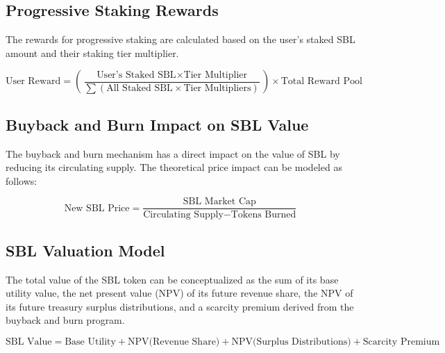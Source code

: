 \subsection{Progressive Staking Rewards}
The rewards for progressive staking are calculated based on the user's staked SBL amount and their staking tier multiplier.

\begin{equation}
\text{User Reward} = (\frac{\text{User's Staked SBL} \times \text{Tier Multiplier}}{\sum (\text{All Staked SBL} \times \text{Tier Multipliers})}) \times \text{Total Reward Pool}
\end{equation}

\subsection{Buyback and Burn Impact on SBL Value}
The buyback and burn mechanism has a direct impact on the value of SBL by reducing its circulating supply. The theoretical price impact can be modeled as follows:

\begin{equation}
\text{New SBL Price} = \frac{\text{SBL Market Cap}}{\text{Circulating Supply} - \text{Tokens Burned}}
\end{equation}

\subsection{SBL Valuation Model}
The total value of the SBL token can be conceptualized as the sum of its base utility value, the net present value (NPV) of its future revenue share, the NPV of its future treasury surplus distributions, and a scarcity premium derived from the buyback and burn program.

\begin{equation}
\text{SBL Value} = \text{Base Utility} + \text{NPV(Revenue Share)} + \text{NPV(Surplus Distributions)} + \text{Scarcity Premium}
\end{equation}
